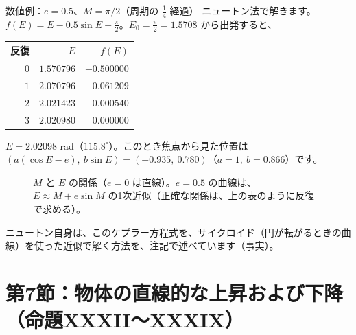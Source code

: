 \documentclass[a4paper,11pt,openany]{ltjsbook}
\begin{document}
\begin{examplebox}{数値例：$e=0.5$、$M=\pi/2$（周期の $\frac14$ 経過）}
ニュートン法で解きます。$f(E)=E-0.5\sin E-\frac\pi2$。$E_0=\frac\pi2=1.5708$ から出発すると、
\end{examplebox}

\begin{center}
\begin{tabular}{rrr}
\toprule
反復 & $E$ & $f(E)$\\
\midrule
$0$ & $1.570796$ & $-0.500000$\\
$1$ & $2.070796$ & $0.061209$\\
$2$ & $2.021423$ & $0.000540$\\
$3$ & $2.020980$ & $0.000000$\\
\bottomrule
\end{tabular}
\end{center}

$E=2.02098$ rad（$115.8^\circ$）。このとき焦点から見た位置は $(a(\cos E-e),\ b\sin E)=(-0.935,\ 0.780)$（$a=1,\ b=0.866$）です。

\begin{figure}[htbp]
\centering
{}
\caption{$M$ と $E$ の関係（$e=0$ は直線）。$e=0.5$ の曲線は、$E\approx M+e\sin M$ の1次近似（正確な関係は、上の表のように反復で求める）。}
\end{figure}

ニュートン自身は、このケプラー方程式を、サイクロイド（円が転がるときの曲線）を使った近似で解く方法を、注記で述べています（事実）。

\section{第7節：物体の直線的な上昇および下降（命題XXXII〜XXXIX）}
\end{document}
